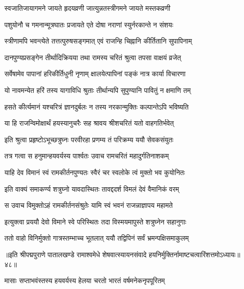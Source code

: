 \twolineshloka
{स्वजातिजायागमने जायते हृदयव्रणी}
{जात्युन्नतस्त्रीगमने जायते मस्तकव्रणी}%

\twolineshloka
{पशुयोनौ च गमनान्मूत्रघातः प्रजायते}
{एते दोषा नराणां स्युर्नरकान्ते न संशयः}%

\twolineshloka
{स्त्रीणामपि भवन्त्येते तत्तत्पुरुषसङ्गमात्}
{एवं राजन्हि चिह्नानि कीर्तितानि सुपापिनाम्}%

\twolineshloka
{दानपुण्यप्रसङ्गेन तीर्थादिक्रियया तथा}
{रामस्य चरितं श्रुत्वा तपसा वाक्षयं व्रजेत्}%

\twolineshloka
{सर्वेषामेव पापानां हरिकीर्तिधुनी नृणाम्}
{क्षालयेत्पापिनां पङ्कं नात्र कार्या विचारणा}%

\twolineshloka
{यो नावमन्येत हरिं तस्य यागाविधि श्रुताः}
{तीर्थान्यपि सुपुण्यानि पावितुं न क्षमाणि तम्}%

\twolineshloka
{हसते कीर्त्यमानं यश्चरित्रं ज्ञानदुर्बलः}
{न तस्य नरकान्मुक्तिः कल्पान्तेऽपि भविष्यति}%

\twolineshloka
{या हि राजन्विमोक्षार्थं हयस्यानुचरैः सह}
{श्रावय श्रीशचरितं यतो वाहगतिर्भवेत्}%


\twolineshloka
{इति श्रुत्वा प्रहृष्टोऽभूच्छत्रुघ्नः परवीरहा}
{प्रणम्य तं परिक्रम्य ययौ सेवकसंयुतः}%

\twolineshloka
{तत्र गत्वा स हनुमान्हयवर्यस्य पार्श्वतः}
{उवाच रामचरितं महादुर्गतिनाशकम्}%

\twolineshloka
{याहि देव विमानं स्वं रामकीर्तनपुण्यतः}
{स्वैरं चर स्वलोके त्वं मुक्तो भव कुयोनितः}%

\twolineshloka
{इति वाक्यं समाकर्ण्य शत्रुघ्नो यावदास्थितः}
{तावद्ददर्श विमलं देवं वैमानिकं वरम्}%

\twolineshloka
{स उवाच विमुक्तोऽहं रामकीर्तनसंश्रुतेः}
{यामि स्वं भवनं राजन्नाज्ञापय महामते}%

\twolineshloka
{इत्युक्त्वा प्रययौ देवो विमाने स्वे परिस्थितः}
{तदा विस्मयमापुस्ते शत्रुघ्नेन सहानुगाः}%

\twolineshloka
{ततो वाहो विनिर्मुक्तो गात्रस्तम्भाच्च भूतलात्}
{ययौ तद्विपिनं सर्वं भ्रमन्पक्षिसमाकुलम्}%

{॥इति श्रीपद्मपुराणे पातालखण्डे रामाश्वमेधे शेषवात्स्यायनसंवादे हयनिर्मुक्तिर्नामाष्टचत्वारिंशत्तमोऽध्यायः॥४८॥}

\resetShloka


\twolineshloka
{मासाः सप्ताभवंस्तस्य हयवर्यस्य हेलया}
{चरतो भारतं वर्षमनेकनृपपूरितम्}%

